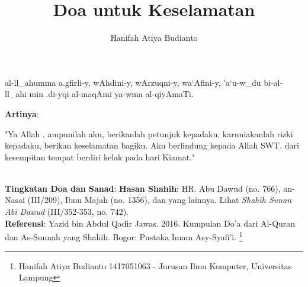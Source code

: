 \documentclass[a4paper,12pt]{article}
\title{\Large Doa untuk Keselamatan}
\author{\calligra Hanifah Atiya Budianto}
\begin{document}
\sffamily
\maketitle 
\fullvocalize
{}
\begin{arabtext}
\noindent
al-ll_ahumma a.gfirli-y, wAhdini-y, wArzuqni-y, wa`Afini-y, 'a`u-w_du 
bi-al-ll_ahi min .di-yqi al-maqAmi ya-wma al-qiyAmaTi.\\
\end{arabtext}
\noindent
\textbf{Artinya}:
\par
\indent
"Ya Allah , ampunilah aku, berikanlah petunjuk kepadaku, karuniakanlah 
rizki kepadaku, berikan keselamatan bagiku. Aku berlindung kepada Allah 
SWT. dari kesempitan tempat berdiri kelak pada hari Kiamat."\\\\
\par
\noindent
\textbf{Tingkatan Doa dan Sanad}: \textbf{Hasan Shahih}: HR. Abu Dawud (no.
766), an-Nasai (III/209), Ibnu Majah (no. 1356), dan yang lainnya. Lihat
\textit{Shah\^{i}h Sunan Abi Dawud} (III/352-353, no. 742).\\
\textbf{Referensi}: Yazid bin Abdul Qadir Jawas. 2016. Kumpulan Do'a dari
Al-Quran dan As-Sunnah yang Shahih. Bogor: Pustaka Imam Asy-Syafi'i.
\footnote{Hanifah Atiya Budianto 1417051063 - Jurusan Ilmu Komputer,
Universitas Lampung}
\end{document}

